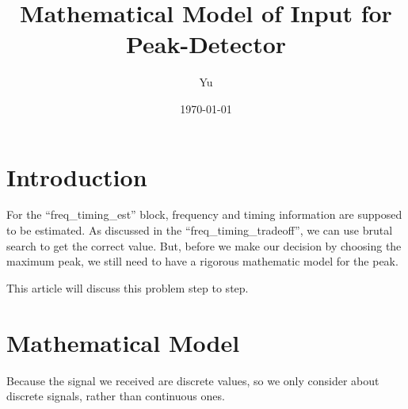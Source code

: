 \documentclass[a4paper]{article}
\title{Mathematical Model of Input for Peak-Detector}
\author{Yu}
\date{\today}
\begin{document}

\maketitle

\DeclarePairedDelimiter\ceil{\lceil}{\rceil}
\DeclarePairedDelimiter\floor{\lfloor}{\rfloor}

\section{Introduction} %
\label{sec:introduction}
For the ``freq\_timing\_est'' block, frequency and timing information are supposed to be estimated. As discussed in the ``freq\_timing\_tradeoff'', we can use brutal search to get the correct value. But, before we make our decision by choosing the maximum peak, we still need to have a rigorous mathematic model for the peak.

This article will discuss this problem step to step.


\section{Mathematical Model} %
\label{sec:mathematical_model}
Because the signal we received are discrete values, so we only consider about discrete signals, rather than continuous ones.
\end{document}

